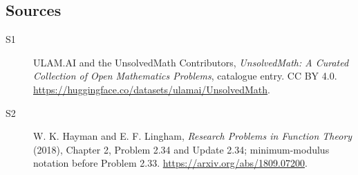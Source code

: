 \documentclass[11pt]{article}
\begin{document}
\subsection{Sources}
\begin{description}
\item[\hypertarget{source:statement:1}{S1}] ULAM.AI and the UnsolvedMath Contributors, \emph{UnsolvedMath: A Curated Collection of Open Mathematics Problems}, catalogue entry. CC BY 4.0. \url{https://huggingface.co/datasets/ulamai/UnsolvedMath}.
\item[\hypertarget{source:statement:2}{S2}] W. K. Hayman and E. F. Lingham, \emph{Research Problems in Function Theory} (2018), Chapter 2, Problem 2.34 and Update 2.34; minimum-modulus notation before Problem 2.33. \url{https://arxiv.org/abs/1809.07200}.
\end{description}
\label{end:statement}
\end{document}
